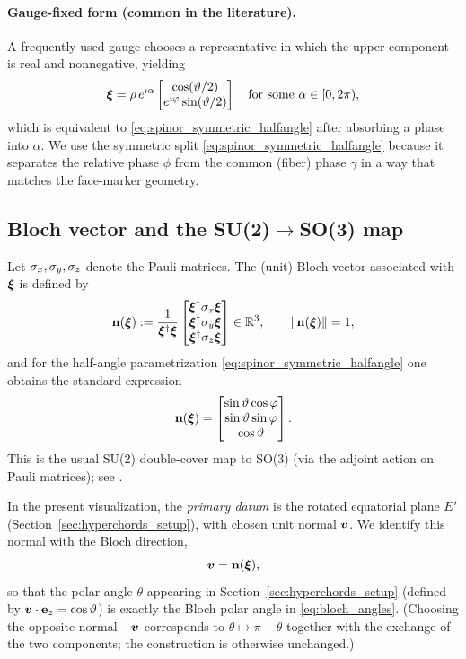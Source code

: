 \paragraph{Gauge-fixed form (common in the literature).}
A frequently used gauge chooses a representative in which the upper component is real and nonnegative, yielding
\[
\bm{\xi}
=
\rho\,e^{\imath\alpha}
\begin{bmatrix}
\cos(\vartheta/2)\\
e^{\imath\varphi}\sin(\vartheta/2)
\end{bmatrix}
\quad\text{for some }\alpha\in[0,2\pi),
\]
which is equivalent to \eqref{eq:spinor_symmetric_halfangle} after absorbing a phase into $\alpha$.
We use the symmetric split \eqref{eq:spinor_symmetric_halfangle} because it separates the relative phase $\phi$ from the common (fiber) phase $\gamma$ in a way that matches the face-marker geometry.


\subsection{Bloch vector and the SU(2)\texorpdfstring{\(\to\)}{->}SO(3) map}
\label{sec:bloch_vector}

Let \({\sigma}_x,{\sigma}_y,{\sigma}_z\) denote the Pauli matrices.
The (unit) Bloch vector associated with \(\bm{\xi}\) is defined by
\begin{equation}
\label{eq:bloch_def}
\mathbf{n}(\bm{\xi})
:=
\frac{1}{\bm{\xi}^\dagger\bm{\xi}}
\begin{bmatrix}
\bm{\xi}^\dagger{\sigma}_x\bm{\xi}\\
\bm{\xi}^\dagger{\sigma}_y\bm{\xi}\\
\bm{\xi}^\dagger{\sigma}_z\bm{\xi}
\end{bmatrix}
\in\mathbb{R}^3,
\qquad
\lVert\mathbf{n}(\bm{\xi})\rVert=1,
\end{equation}
and for the half-angle parametrization \eqref{eq:spinor_symmetric_halfangle} one obtains the standard expression
\begin{equation}
\label{eq:bloch_angles}
\mathbf{n}(\bm{\xi})=
\begin{bmatrix}
\sin\vartheta\cos\varphi\\
\sin\vartheta\sin\varphi\\
\cos\vartheta
\end{bmatrix}.
\end{equation}
This is the usual SU(2) double-cover map to SO(3) (via the adjoint action on Pauli matrices); see \cite{altmann2013rotations,penrose1984spinors}.

In the present visualization, the \emph{primary datum} is the rotated equatorial plane \(E'\) (Section~\ref{sec:hyperchords_setup}), with chosen unit normal \(\bm{v}\).
We identify this normal with the Bloch direction,
\begin{equation}
\label{eq:v_equals_bloch}
\bm{v}=\mathbf{n}(\bm{\xi}),
\end{equation}
so that the polar angle \(\theta\) appearing in Section~\ref{sec:hyperchords_setup} (defined by \(\bm{v}\cdot\mathbf{e}_{z}=\cos\vartheta\)) is exactly the Bloch polar angle in \eqref{eq:bloch_angles}. (Choosing the opposite normal $-\bm{v}$ corresponds to $\theta\mapsto\pi-\theta$ together with the exchange of the two components; the construction is otherwise unchanged.)

